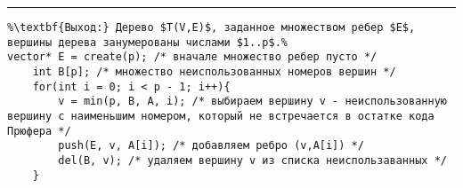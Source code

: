 \vspace{5pt} \hrule
\begin{lstlisting}[caption={Распаковка кода Прюфера свободного дерева}, label=p_304, escapechar=\%]
%\noindent\textbf{Вход:} Массив $int A[p - 1]$ - код Прюфера дерева $T$.\\%
%\textbf{Выход:} Дерево $T(V,E)$, заданное множеством ребер $E$, вершины дерева занумерованы числами $1..p$.%
vector* E = create(p); /* вначале множество ребер пусто */
	int B[p]; /* множество неиспользованных номеров вершин */
	for(int i = 0; i < p - 1; i++){
		v = min(p, B, A, i); /* выбираем вершину v - неиспользованную вершину с наименьшим номером, который не встречается в остатке кода Прюфера */
		push(E, v, A[i]); /* добавляем ребро (v,A[i]) */
		del(B, v); /* удаляем вершину v из списка неиспользаванных */
	}
\end{lstlisting}
